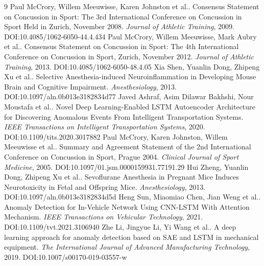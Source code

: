 \documentclass[11pt]{article}
\begin{document}
\begin{thebibliography}{9}
 Paul McCrory, Willem Meeuwisse, Karen Johnston et al.. Consensus Statement on Concussion in Sport: The 3rd International Conference on Concussion in Sport Held in Zurich, November 2008. \emph{Journal of Athletic Training}, 2009. DOI:10.4085/1062-6050-44.4.434
 Paul McCrory, Willem Meeuwisse, Mark Aubry et al.. Consensus Statement on Concussion in Sport: The 4th International Conference on Concussion in Sport, Zurich, November 2012. \emph{Journal of Athletic Training}, 2013. DOI:10.4085/1062-6050-48.4.05
 Xia Shen, Yuanlin Dong, Zhipeng Xu et al.. Selective Anesthesia-induced Neuroinflammation in Developing Mouse Brain and Cognitive Impairment. \emph{Anesthesiology}, 2013. DOI:10.1097/aln.0b013e3182834d77
 Javed Ashraf, Asim Dilawar Bakhshi, Nour Moustafa et al.. Novel Deep Learning-Enabled LSTM Autoencoder Architecture for Discovering Anomalous Events From Intelligent Transportation Systems. \emph{IEEE Transactions on Intelligent Transportation Systems}, 2020. DOI:10.1109/tits.2020.3017882
 Paul McCrory, Karen Johnston, Willem Meeuwisse et al.. Summary and Agreement Statement of the 2nd International Conference on Concussion in Sport, Prague 2004. \emph{Clinical Journal of Sport Medicine}, 2005. DOI:10.1097/01.jsm.0000159931.77191.29
 Hui Zheng, Yuanlin Dong, Zhipeng Xu et al.. Sevoflurane Anesthesia in Pregnant Mice Induces Neurotoxicity in Fetal and Offspring Mice. \emph{Anesthesiology}, 2013. DOI:10.1097/aln.0b013e3182834d5d
 Heng Sun, Miaomiao Chen, Jian Weng et al.. Anomaly Detection for In-Vehicle Network Using CNN-LSTM With Attention Mechanism. \emph{IEEE Transactions on Vehicular Technology}, 2021. DOI:10.1109/tvt.2021.3106940
 Zhe Li, Jingyue Li, Yi Wang et al.. A deep learning approach for anomaly detection based on SAE and LSTM in mechanical equipment. \emph{The International Journal of Advanced Manufacturing Technology}, 2019. DOI:10.1007/s00170-019-03557-w
\end{thebibliography}
\end{document}
